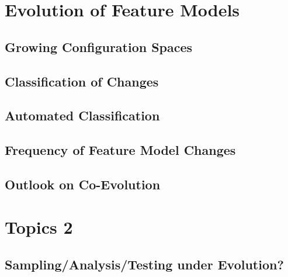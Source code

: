 

\subtitle{12. Evolution and Maintenance}
\author{Timo Kehrer, Thomas Thüm}





\section{Evolution of Feature Models}

\subsection{Growing Configuration Spaces}
\subsection{Classification of Changes}
\subsection{Automated Classification}
\subsection{Frequency of Feature Model Changes}
\subsection{Outlook on Co-Evolution}

%

\lessonslearned{
	\item \ldots
}{
	\item \ldots
}{
	\ldots
}

\sectionend

\section{Topics 2}

\subsection{Sampling/Analysis/Testing under Evolution?}
